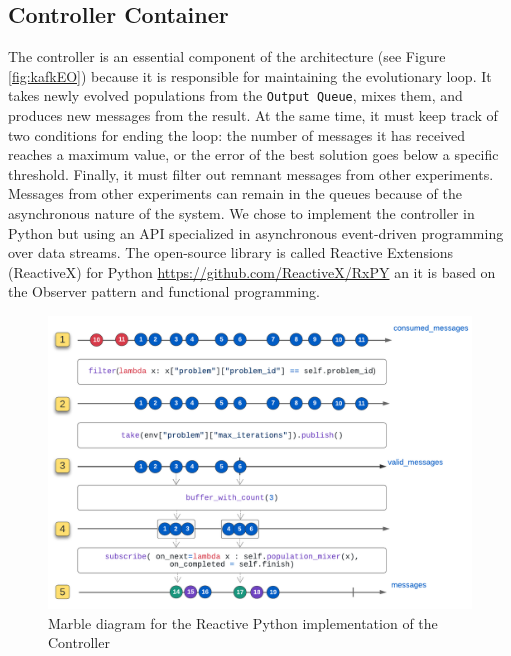 \documentclass[review]{elsarticle}
\begin{document}
\subsection{Controller Container} 
\label{controller}

The controller is an essential component of the architecture (see Figure \ref{fig:kafkEO})
because it is responsible for maintaining the evolutionary loop. It takes newly
evolved populations from the \texttt{Output Queue}, mixes them,   and produces new
messages from the result. At the same time, it must keep track of two conditions
for ending the loop: the number of messages it has received reaches a maximum
value, or the error of the best solution goes below a specific threshold.  Finally, it
must filter out remnant messages from other experiments. Messages from other
experiments can remain in the queues because of the asynchronous nature of the
system.  We chose to implement the controller in Python but using an API
specialized in asynchronous event-driven programming over data streams.  
The open-source library is called Reactive Extensions (ReactiveX) for Python 
\url{https://github.com/ReactiveX/RxPY} an it is based on the Observer 
pattern \cite{gamma1995design} and functional programming.

\begin{figure}[ht]
    \centering
    \includegraphics[width=\textwidth]{marble_controller}
    \caption{Marble diagram for the Reactive Python implementation of the Controller}
    \label{fig:marble_controller}
\end{figure}
\end{document}
